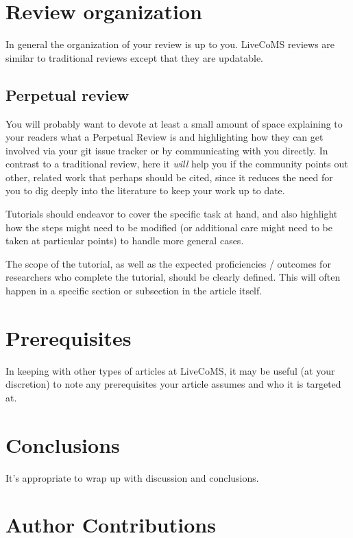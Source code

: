 \documentclass[9pt,review]{livecoms}
\begin{document}
\section{Review organization}

In general the organization of your review is up to you.
LiveCoMS reviews are similar to traditional reviews except that they are updatable.

\subsection{Perpetual review}

You will probably want to devote at least a small amount of space explaining to your readers what a Perpetual Review is and highlighting how they can get involved via your git issue tracker or by communicating with you directly.
In contrast to a traditional review, here it \emph{will} help you if the community points out other, related work that perhaps should be cited, since it reduces the need for you to dig deeply into the literature to keep your work up to date.

Tutorials should endeavor to cover the specific task at hand, and also highlight how the steps might need to be modified (or additional care might need to be taken at particular points) to handle more general cases.

The scope of the tutorial, as well as the expected proficiencies / outcomes for researchers who complete the tutorial, should be clearly defined.
This will often happen in a specific section or subsection in the article itself.

\section{Prerequisites}

In keeping with other types of articles at LiveCoMS, it may be useful (at your discretion) to note any prerequisites your article assumes and who it is targeted at.

\section{Conclusions}

It's appropriate to wrap up with discussion and conclusions.







\section*{Author Contributions}
%
\end{document}
